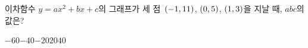 이차함수 $y=ax^2+bx+c$의 그래프가 세 점~$(-1{,}\mkern3mu 11)$, $(0{,}\mkern3mu 5)$, $(1{,}\mkern3mu 3)$을 지날 때, $abc$의 값은? 
\begin{choices32}{$-60$}{$-40$}{$-20$}{$20$}{$40$}\end{choices32}
